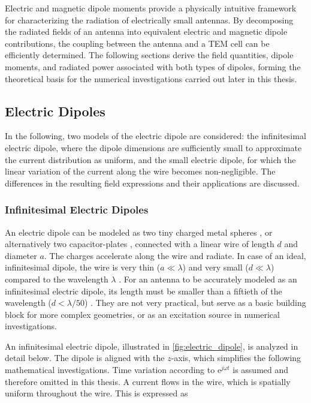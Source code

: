 
Electric and magnetic dipole moments provide a physically intuitive 
framework for characterizing the radiation of electrically small antennas. 
By decomposing the radiated fields of an antenna into equivalent electric and 
magnetic dipole contributions, the coupling between the antenna and a TEM cell 
can be efficiently determined. The following sections derive the field quantities, dipole moments, 
and radiated power associated with both types of dipoles, forming the theoretical 
basis for the numerical investigations carried out later in this thesis.


\subsection{Electric Dipoles}\label{sec:ele_dip}

In the following, two models of the electric dipole are considered: the infinitesimal
electric dipole, where the dipole dimensions are sufficiently small to approximate
the current distribution as uniform, and the small electric dipole, for which the
linear variation of the current along the wire becomes non-negligible. The
differences in the resulting field expressions and their applications are discussed.

\subsubsection{Infinitesimal Electric Dipoles}\label{sec:infinitesimal_electric_dipoles}

An electric dipole can be modeled as two tiny charged metal spheres \cite[p.~467]{Griffiths_2024}, or alternatively two capacitor-plates \cite[p.~151]{Balanis_1997}, connected with a linear wire of length $d$ and diameter $a$. The charges accelerate along the wire and radiate. In case of an ideal, infinitesimal dipole, the wire is very thin ($a\ll \lambda$) and very small ($d \ll \lambda$) compared to the wavelength $\lambda$ \cites[p. 151]{Balanis_1997}[p. 468]{Griffiths_2024}. For an antenna to be accurately modeled as an infinitesimal electric dipole, its length must be smaller than a fiftieth of the wavelength ($d < \lambda/50$) \cite[p. 156]{Balanis_1997}. They are not very practical, but serve as a basic building block for more complex geometries, or as an excitation source in numerical investigations. 

An infinitesimal electric dipole, illustrated in \autoref{fig:electric_dipole}, is analyzed in detail below. The dipole is aligned with the $z$-axis, which simplifies the following mathematical investigations. Time variation according to $\mathrm{e}^{j\omega t}$ is assumed and therefore omitted in this thesis. A current flows in the wire, which is spatially uniform throughout the wire. This is expressed as \cite[p. 151]{Balanis_1997}

